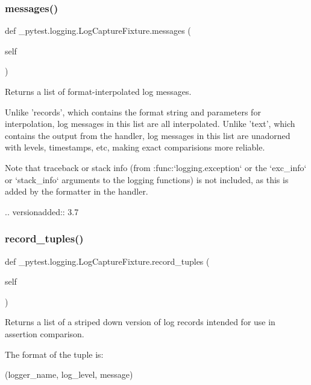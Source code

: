 \subsubsection{\texorpdfstring{messages()}{messages()}}
{\footnotesize\ttfamily def \+\_\+pytest.\+logging.\+Log\+Capture\+Fixture.\+messages (\begin{DoxyParamCaption}\item[{}]{self }\end{DoxyParamCaption})}

\begin{DoxyVerb}Returns a list of format-interpolated log messages.

Unlike 'records', which contains the format string and parameters for interpolation, log messages in this list
are all interpolated.
Unlike 'text', which contains the output from the handler, log messages in this list are unadorned with
levels, timestamps, etc, making exact comparisions more reliable.

Note that traceback or stack info (from :func:`logging.exception` or the `exc_info` or `stack_info` arguments
to the logging functions) is not included, as this is added by the formatter in the handler.

.. versionadded:: 3.7
\end{DoxyVerb}
 \mbox{\label{class__pytest_1_1logging_1_1_log_capture_fixture_a1b9b4a75a5b14249e040436e53dffa95}} 
\subsubsection{\texorpdfstring{record\+\_\+tuples()}{record\_tuples()}}
{\footnotesize\ttfamily def \+\_\+pytest.\+logging.\+Log\+Capture\+Fixture.\+record\+\_\+tuples (\begin{DoxyParamCaption}\item[{}]{self }\end{DoxyParamCaption})}

\begin{DoxyVerb}Returns a list of a striped down version of log records intended
for use in assertion comparison.

The format of the tuple is:

    (logger_name, log_level, message)
\end{DoxyVerb}
 \mbox{\label{class__pytest_1_1logging_1_1_log_capture_fixture_a90b009f2fdf80ff95d66688fcc699471}} 
